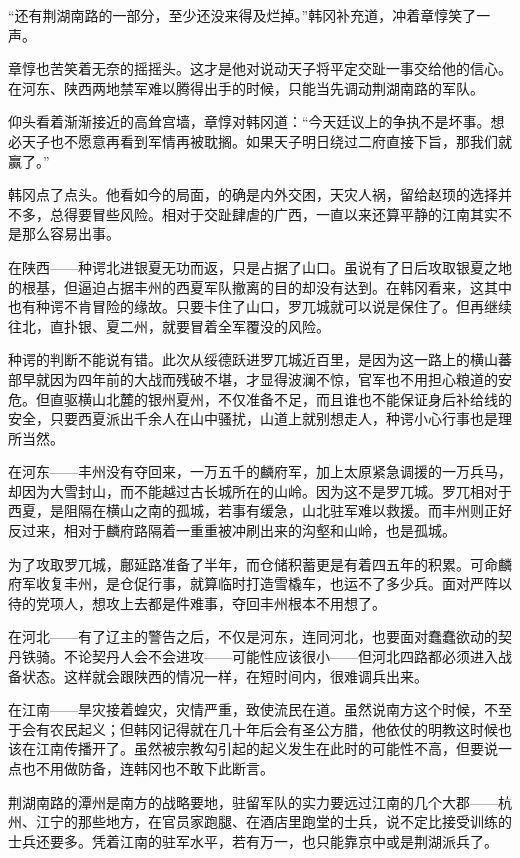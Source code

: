 “还有荆湖南路的一部分，至少还没来得及烂掉。”韩冈补充道，冲着章惇笑了一声。

章惇也苦笑着无奈的摇摇头。这才是他对说动天子将平定交趾一事交给他的信心。在河东、陕西两地禁军难以腾得出手的时候，只能当先调动荆湖南路的军队。

仰头看着渐渐接近的高耸宫墙，章惇对韩冈道：“今天廷议上的争执不是坏事。想必天子也不愿意再看到军情再被耽搁。如果天子明日绕过二府直接下旨，那我们就赢了。”

韩冈点了点头。他看如今的局面，的确是内外交困，天灾人祸，留给赵顼的选择并不多，总得要冒些风险。相对于交趾肆虐的广西，一直以来还算平静的江南其实不是那么容易出事。

在陕西——种谔北进银夏无功而返，只是占据了山口。虽说有了日后攻取银夏之地的根基，但逼迫占据丰州的西夏军队撤离的目的却没有达到。在韩冈看来，这其中也有种谔不肯冒险的缘故。只要卡住了山口，罗兀城就可以说是保住了。但再继续往北，直扑银、夏二州，就要冒着全军覆没的风险。

种谔的判断不能说有错。此次从绥德跃进罗兀城近百里，是因为这一路上的横山蕃部早就因为四年前的大战而残破不堪，才显得波澜不惊，官军也不用担心粮道的安危。但直驱横山北麓的银州夏州，不仅准备不足，而且谁也不能保证身后补给线的安全，只要西夏派出千余人在山中骚扰，山道上就别想走人，种谔小心行事也是理所当然。

在河东——丰州没有夺回来，一万五千的麟府军，加上太原紧急调援的一万兵马，却因为大雪封山，而不能越过古长城所在的山岭。因为这不是罗兀城。罗兀相对于西夏，是阻隔在横山之南的孤城，若事有缓急，山北驻军难以救援。而丰州则正好反过来，相对于麟府路隔着一重重被冲刷出来的沟壑和山岭，也是孤城。

为了攻取罗兀城，鄜延路准备了半年，而仓储积蓄更是有着四五年的积累。可命麟府军收复丰州，是仓促行事，就算临时打造雪橇车，也运不了多少兵。面对严阵以待的党项人，想攻上去都是件难事，夺回丰州根本不用想了。

在河北——有了辽主的警告之后，不仅是河东，连同河北，也要面对蠢蠢欲动的契丹铁骑。不论契丹人会不会进攻——可能性应该很小——但河北四路都必须进入战备状态。这样就会跟陕西的情况一样，在短时间内，很难调兵出来。

在江南——旱灾接着蝗灾，灾情严重，致使流民在道。虽然说南方这个时候，不至于会有农民起义；但韩冈记得就在几十年后会有圣公方腊，他依仗的明教这时候也该在江南传播开了。虽然被宗教勾引起的起义发生在此时的可能性不高，但要说一点也不用做防备，连韩冈也不敢下此断言。

荆湖南路的潭州是南方的战略要地，驻留军队的实力要远过江南的几个大郡——杭州、江宁的那些地方，在官员家跑腿、在酒店里跑堂的士兵，说不定比接受训练的士兵还要多。凭着江南的驻军水平，若有万一，也只能靠京中或是荆湖派兵了。

